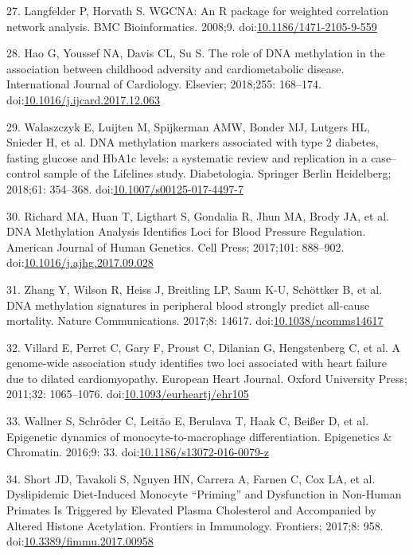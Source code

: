 \documentclass[]{article}
\theoremstyle{definition}
\theoremstyle{definition}
\theoremstyle{definition}
\theoremstyle{remark}
\begin{document}
27. Langfelder P, Horvath S. WGCNA: An R package for weighted
correlation network analysis. BMC Bioinformatics. 2008;9.
doi:\href{http://dx.doi.org/10.1186/1471-2105-9-559}{10.1186/1471-2105-9-559}

28. Hao G, Youssef NA, Davis CL, Su S. The role of DNA methylation in
the association between childhood adversity and cardiometabolic disease.
International Journal of Cardiology. Elsevier; 2018;255: 168--174.
doi:\href{http://dx.doi.org/10.1016/j.ijcard.2017.12.063}{10.1016/j.ijcard.2017.12.063}

29. Walaszczyk E, Luijten M, Spijkerman AMW, Bonder MJ, Lutgers HL,
Snieder H, et al. DNA methylation markers associated with type 2
diabetes, fasting glucose and HbA1c levels: a systematic review and
replication in a case--control sample of the Lifelines study.
Diabetologia. Springer Berlin Heidelberg; 2018;61: 354--368.
doi:\href{http://dx.doi.org/10.1007/s00125-017-4497-7}{10.1007/s00125-017-4497-7}

30. Richard MA, Huan T, Ligthart S, Gondalia R, Jhun MA, Brody JA, et
al. DNA Methylation Analysis Identifies Loci for Blood Pressure
Regulation. American Journal of Human Genetics. Cell Press; 2017;101:
888--902.
doi:\href{http://dx.doi.org/10.1016/j.ajhg.2017.09.028}{10.1016/j.ajhg.2017.09.028}

31. Zhang Y, Wilson R, Heiss J, Breitling LP, Saum K-U, Sch{ö}ttker B,
et al. DNA methylation signatures in peripheral blood strongly predict
all-cause mortality. Nature Communications. 2017;8: 14617.
doi:\href{http://dx.doi.org/10.1038/ncomms14617}{10.1038/ncomms14617}

32. Villard E, Perret C, Gary F, Proust C, Dilanian G, Hengstenberg C,
et al. A genome-wide association study identifies two loci associated
with heart failure due to dilated cardiomyopathy. European Heart
Journal. Oxford University Press; 2011;32: 1065--1076.
doi:\href{http://dx.doi.org/10.1093/eurheartj/ehr105}{10.1093/eurheartj/ehr105}

33. Wallner S, Schr{ö}der C, Leit{ã}o E, Berulava T, Haak C, Bei{ß}er D,
et al. Epigenetic dynamics of monocyte-to-macrophage differentiation.
Epigenetics \& Chromatin. 2016;9: 33.
doi:\href{http://dx.doi.org/10.1186/s13072-016-0079-z}{10.1186/s13072-016-0079-z}

34. Short JD, Tavakoli S, Nguyen HN, Carrera A, Farnen C, Cox LA, et al.
Dyslipidemic Diet-Induced Monocyte ``Priming'' and Dysfunction in
Non-Human Primates Is Triggered by Elevated Plasma Cholesterol and
Accompanied by Altered Histone Acetylation. Frontiers in Immunology.
Frontiers; 2017;8: 958.
doi:\href{http://dx.doi.org/10.3389/fimmu.2017.00958}{10.3389/fimmu.2017.00958}
\end{document}
